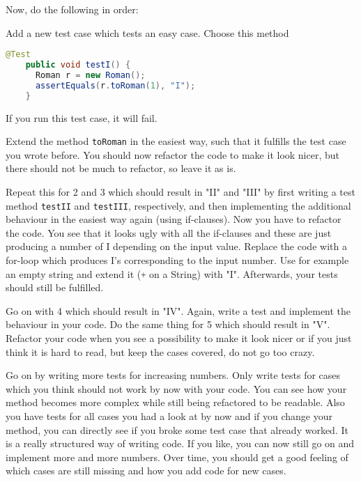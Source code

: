 \documentclass[language=en,sheet=1,prefix]{exercise}
\begin{document}
Now, do the following in order:
\begin{compactenum}
	\item Add a new test case which tests an easy case. Choose this method
	\begin{lstlisting}[language = java, gobble = 8]
	@Test
	public void testI() {
	  Roman r = new Roman();
	  assertEquals(r.toRoman(1), "I");
	}
	\end{lstlisting}
	If you run this test case, it will fail.
	\item Extend the method \lstinline[language = java]{toRoman} in the easiest way, such that it fulfills the test case you wrote before. You should now refactor the code to make it look nicer, but there should not be much to refactor, so leave it as is.
	\item Repeat this for 2 and 3 which should result in "II" and "III" by first writing a test method \lstinline[language = java]{testII} and \lstinline[language = java]{testIII}, respectively, and then implementing the additional behaviour in the easiest way again (using if-clauses). Now you have to refactor the code. You see that it looks ugly with all the if-clauses and these are just producing a number of I depending on the input value. Replace the code with a for-loop which produces I's corresponding to the input number. Use for example an empty string and extend it (\lstinline[language = java]{+} on a String) with "I". Afterwards, your tests should still be fulfilled.
	\item Go on with 4 which should result in "IV". Again, write a test and implement the behaviour in your code. Do the same thing for 5 which should result in "V". Refactor your code when you see a possibility to make it look nicer or if you just think it is hard to read, but keep the cases covered, do not go too crazy.
	\item Go on by writing more tests for increasing numbers. Only write tests for cases which you think should not work by now with your code. You can see how your method becomes more complex while still being refactored to be readable. Also you have tests for all cases you had a look at by now and if you change your method, you can directly see if you broke some test case that already worked. It is a really structured way of writing code. If you like, you can now still go on and implement more and more numbers. Over time, you should get a good feeling of which cases are still missing and how you add code for new cases.
\end{compactenum}
\end{document}
